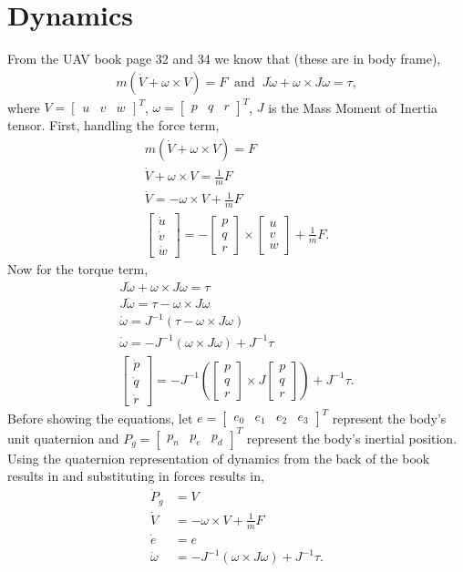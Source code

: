 \documentclass[11pt]{article}
\newcommand{\mathse}[1]{\begin{gather*}#1\end{gather*}}
\newcommand{\mat}[1]{\begin{bmatrix} #1 \end{bmatrix}}
\newcommand{\sinput}[1]{}
\begin{document}
\section{Dynamics}
From the UAV book page 32 and 34 we know that (these are in body frame),
\mathse{
    m\left(\dot{V} + \omega\times V\right) = F\;\;\text{and}\;\; J\dot{\omega} + \omega\times J\omega = \tau,
}
where $V = \mat{u & v & w}^T$, $\omega = \mat{p & q & r}^T$, $J$ is the Mass Moment of Inertia tensor. First, handling the force term,
\mathse{
    m\left(\dot{V} + \omega\times V\right) = F\\
    \dot{V} + \omega\times V = \frac{1}{m}F\\
    \dot{V} = -\omega\times V + \frac{1}{m}F\\
    \boxed{\mat{\dot{u}\\ \dot{v}\\ \dot{w}} = -\mat{p\\ q\\ r}\times\mat{u\\ v\\ w} + \frac{1}{m}F}.
}
Now for the torque term,
\mathse{
    J\dot{\omega} + \omega\times J\omega = \tau\\
    J\dot{\omega}  = \tau - \omega\times J\omega\\
    \dot{\omega}  = J^{-1}\left(\tau - \omega\times J\omega\right)\\
    \dot{\omega}  = -J^{-1}\left(\omega\times J\omega\right) + J^{-1}\tau\\
    \boxed{\mat{\dot{p}\\ \dot{q}\\ \dot{r}}  = -J^{-1}\left(\mat{p\\ q\\ r}\times J\mat{p\\ q\\ r}\right) + J^{-1}\tau}.
}
Before showing the equations, let $e = \mat{e_0 & e_1 & e_2 & e_3}^T$ represent the body's unit quaternion and $P_g = \mat{p_n & p_e & p_d}^T$ represent the body's inertial position.
Using the quaternion representation of dynamics from the back of the book results in and substituting in forces results in,
\begin{align*}
    \dot{P}_g &= \sinput{M1}V\\
    \dot{V} &= -\omega\times V  + \frac{1}{m}F\\
    \dot{e} &= \sinput{M2}e\\
    \dot{\omega} &= -J^{-1}\left(\omega\times J\omega\right) + J^{-1}\tau.
\end{align*}
\end{document}
